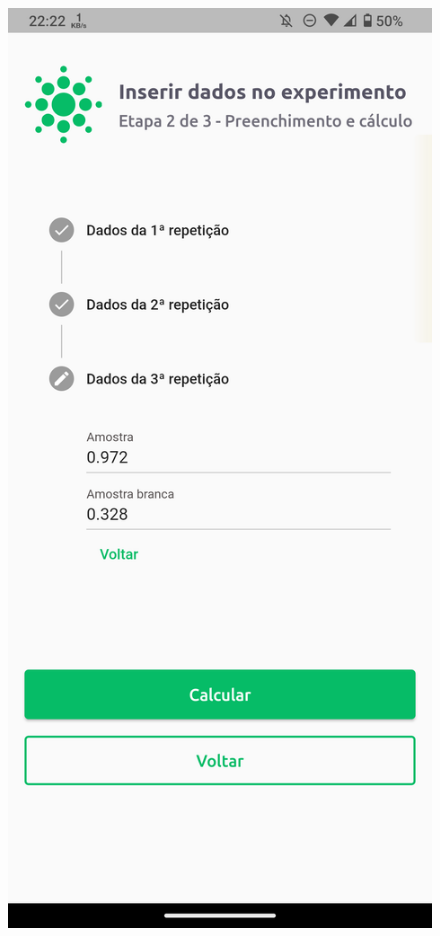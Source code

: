 \begin{figure}[p]
  \includegraphics[width=.3\textwidth]{images/enzitech/calculo_2.png}

  \vspace{1cm}


\end{figure}
